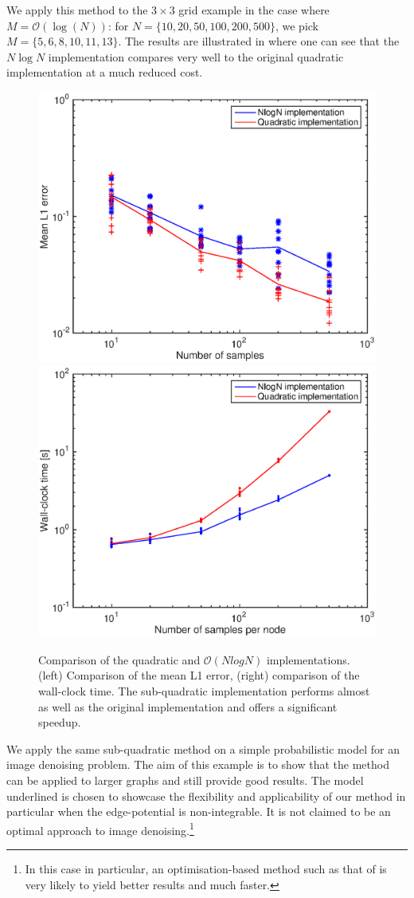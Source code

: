 We apply this method to the $3\times 3$ grid example in the case where $M=\mathcal O(\log(N))$: for $N=\{10,20,50,100,200,500\}$, we pick $M=\{5, 6,8,10,11,13\}$. The results are illustrated in  where one can see that the $N\log N$ implementation compares very well to the original quadratic implementation at a much reduced cost. 


\begin{figure}[!h]
\center
\includegraphics[width=.51\textwidth]{figures/epbp/errCompNLOGN}
\hspace*{-.7cm}
\includegraphics[width=.51\textwidth]{figures/epbp/timeCompNLOGN}
\caption{\label{figCompNLOGN}Comparison of the quadratic and $\mathcal O(N log N )$ implementations. (left) Comparison of the mean L1 error, (right) comparison of the wall-clock time. The sub-quadratic implementation performs almost as well as the original implementation and offers a significant speedup.}
\end{figure}


We apply the same sub-quadratic method on a simple probabilistic model for an image denoising problem. The aim of this example is to show that the method can be applied to larger graphs and still provide good results. The model underlined is chosen to showcase the flexibility and applicability of our method in particular when the edge-potential is non-integrable. It is not claimed to be an optimal approach to image denoising.\footnote{In this case in particular, an optimisation-based method such as that of \citet{rudin92} is very likely to yield better results and much faster.}

